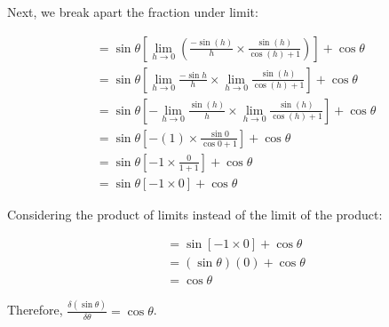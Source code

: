 \documentclass{article}
\begin{document}
Next, we break apart the fraction under limit:

$$
\begin{aligned}
& =\sin \theta\left[\lim _{h \rightarrow 0}\left(\frac{-\sin (h)}{h} \times \frac{\sin (h)}{\cos (h)+1}\right)\right]+\cos \theta \\
& =\sin \theta\left[\lim _{h \rightarrow 0} \frac{-\sin h}{h} \times \lim _{h \rightarrow 0} \frac{\sin (h)}{\cos (h)+1}\right]+\cos \theta \\
& =\sin \theta\left[-\lim _{h \rightarrow 0} \frac{\sin (h)}{h} \times \lim _{h \rightarrow 0} \frac{\sin (h)}{\cos (h)+1}\right]+\cos \theta \\
& =\sin \theta\left[-(1) \times \frac{\sin 0}{\cos 0+1}\right]+\cos \theta \\
& =\sin \theta\left[-1 \times \frac{0}{1+1}\right]+\cos \theta \\
& =\sin \theta[-1 \times 0]+\cos \theta
\end{aligned}
$$

Considering the product of limits instead of the limit of the product:

\begin{align*}
    &=\sin[-1\times 0]+\cos\theta\\
    &=(\sin\theta)(0)+\cos \theta\\
    &=\cos \theta
\end{align*}

Therefore, $\frac{\delta (\sin \theta)}{\delta \theta}=\cos \theta$.
\end{document}
